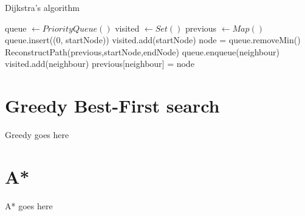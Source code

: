 \documentclass[12pt]{report}
\begin{document}
\begin{algorithm}
\caption{Dijkstra's algorithm}
\begin{algorithmic}[1]
\State queue $\gets PriorityQueue()$
\State visited $\gets Set()$
\State previous $\gets Map()$
\State queue.insert((0, startNode))
\State visited.add(startNode)
	\State node = queue.removeMin()
			 
				\State \Return ReconstructPath(previous,startNode,endNode)
			\EndIf
			\State queue.enqueue(neighbour)
			\State visited.add(neighbour)
			\State previous[neighbour] = node
		\EndIf
	\EndFor
\EndWhile
\EndProcedure
\end{algorithmic}
\end{algorithm}


\section{Greedy Best-First search}
Greedy goes here

\section{A*}
A* goes here
\end{document}
